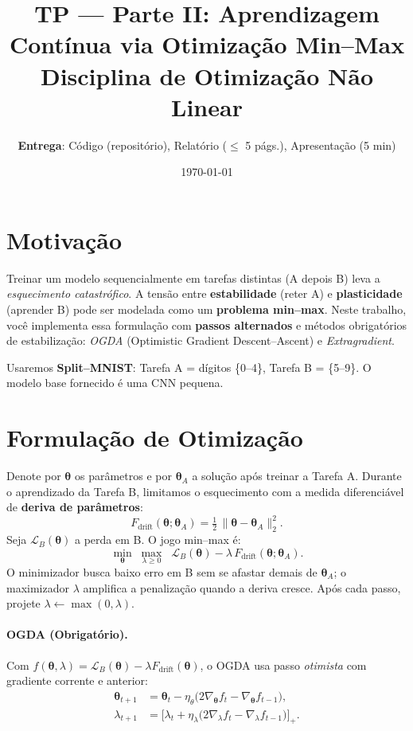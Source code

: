 \documentclass[9pt,a4paper]{extarticle}
\title{\textbf{TP — Parte II: Aprendizagem Contínua via Otimização Min--Max}\\\large Disciplina de Otimização Não Linear}
\author{\textbf{Entrega}: Código (repositório), Relatório ($\leq$ 5 págs.), Apresentação (5 min)}
\date{\today}
\begin{document}
\maketitle

\section*{Motivação}
Treinar um modelo sequencialmente em tarefas distintas (A depois B) leva a \emph{esquecimento catastrófico}. A tensão entre \textbf{estabilidade} (reter A) e \textbf{plasticidade} (aprender B) pode ser modelada como um \textbf{problema min--max}. Neste trabalho, você implementa essa formulação com \textbf{passos alternados} e métodos obrigatórios de estabilização: \emph{OGDA} (Optimistic Gradient Descent--Ascent) e \emph{Extragradient}.

Usaremos \textbf{Split--MNIST}: Tarefa A = dígitos \{0--4\}, Tarefa B = \{5--9\}. O modelo base fornecido é uma CNN pequena.

\section*{Formulação de Otimização}
Denote por $\bm{\theta}$ os parâmetros e por $\bm{\theta}_A$ a solução após treinar a Tarefa A. Durante o aprendizado da Tarefa B, limitamos o esquecimento com a medida diferenciável de \textbf{deriva de parâmetros}:
\begin{equation}
F_{\text{drift}}(\bm{\theta};\bm{\theta}_A)=\tfrac{1}{2}\,\lVert \bm{\theta}-\bm{\theta}_A\rVert_2^2.
\end{equation}
Seja $\mathcal{L}_B(\bm{\theta})$ a perda em B. O jogo min--max é:
\begin{equation}
\min_{\bm{\theta}}\;\max_{\lambda\ge 0}\;\; \mathcal{L}_B(\bm{\theta})-\lambda\,F_{\text{drift}}(\bm{\theta};\bm{\theta}_A).
\label{eq:minmax}
\end{equation}
O minimizador busca baixo erro em B sem se afastar demais de $\bm{\theta}_A$; o maximizador $\lambda$ amplifica a penalização quando a deriva cresce. Após cada passo, projete $\lambda\leftarrow\max(0,\lambda)$.

\paragraph{OGDA (Obrigatório).}
Com $f(\bm{\theta},\lambda)=\mathcal{L}_B(\bm{\theta})-\lambda F_{\text{drift}}(\bm{\theta})$, o OGDA usa passo \emph{otimista} com gradiente corrente e anterior:
\begin{align}
\bm{\theta}_{t+1} &= \bm{\theta}_t - \eta_\theta\bigl(2\nabla_{\bm{\theta}} f_t - \nabla_{\bm{\theta}} f_{t-1}\bigr),\\
\lambda_{t+1} &= \bigl[\lambda_t + \eta_\lambda\bigl(2\nabla_{\lambda} f_t - \nabla_{\lambda} f_{t-1}\bigr)\bigr]_+.
\end{align}
\end{document}
